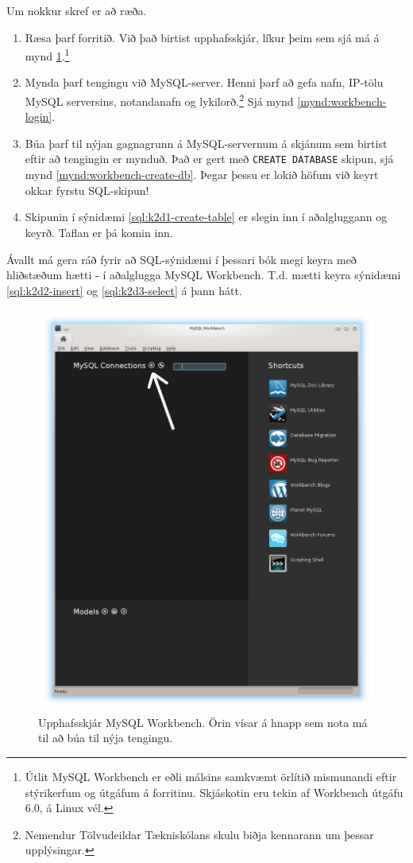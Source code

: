 Um nokkur skref er að ræða.
\begin{enumerate}
 \item Ræsa þarf forritið. Við það birtist upphafsskjár, líkur þeim sem sjá má á mynd \ref{mynd:workbench-upphafsskjar}.\footnote{Útlit MySQL Workbench er eðli málsins samkvæmt örlítið mismunandi eftir stýrikerfum og útgáfum á forritinu. Skjáskotin eru tekin af Workbench útgáfu 6.0, á Linux vél.}
 \item Mynda þarf tengingu við MySQL-server. Henni þarf að gefa nafn, IP-tölu MySQL serversins, notandanafn og lykilorð.\footnote{Nemendur Tölvudeildar Tækniskólans skulu biðja kennarann um þessar upplýsingar.} Sjá mynd \ref{mynd:workbench-login}.
 \item Búa þarf til nýjan gagnagrunn á MySQL-servernum á skjánum sem birtist eftir að tengingin er mynduð. Það er gert með \verb|CREATE DATABASE| skipun, sjá mynd \ref{mynd:workbench-create-db}. Þegar þessu er lokið höfum við keyrt okkar fyrstu SQL-skipun!
 \item Skipunin í sýnidæmi \ref{sql:k2d1-create-table} er slegin inn í aðalgluggann og keyrð. Taflan er þá komin inn.
\end{enumerate}
Ávallt má gera ráð fyrir að SQL-sýnidæmi í þessari bók megi keyra með hliðstæðum hætti - í aðalglugga MySQL Workbench. T.d. mætti keyra sýnidæmi \ref{sql:k2d2-insert} og \ref{sql:k2d3-select} á þann hátt.

\begin{figure}
\caption[Upphafsskjár MySQL Workbench]{Upphafsskjár MySQL Workbench. Örin vísar á hnapp sem nota má til að búa til nýja tengingu.}
\label{mynd:workbench-upphafsskjar}
\centering
\includegraphics[width=\linewidth]{myndir/workbench-upphafsskjar}
\end{figure}

